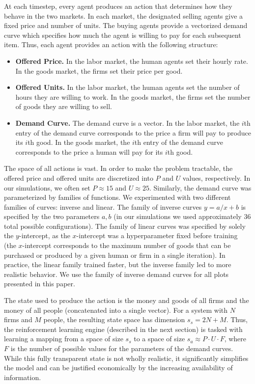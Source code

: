 \documentclass[twoside,twocolumn]{article}
\begin{document}
At each timestep, every agent produces an action that determines how they behave in the two markets. In each market, the designated selling agents give a fixed price and number of units. The buying agents provide a vectorized demand curve which specifies how much the agent is willing to pay for each subsequent item. Thus, each agent provides an action with the following structure:
\begin{itemize}
  \item \textbf{Offered Price.} In the labor market, the human agents set their hourly rate. In the goods market, the firms set their price per good.
  \item \textbf{Offered Units.} In the labor market, the human agents set the number of hours they are willing to work. In the goods market, the firms set the number of goods they are willing to sell.
  \item \textbf{Demand Curve.} The demand curve is a vector. In the labor market, the $i$th entry of the demand curve corresponds to the price a firm will pay to produce its $i$th good. In the goods market, the $i$th entry of the demand curve corresponds to the price a human will pay for its $i$th good.
\end{itemize}

The space of all actions is vast. In order to make the problem tractable, the offered price and offered units are discretized into $P$ and $U$ values, respectively. In our simulations, we often set $P \approx 15$ and $U \approx 25$. Similarly, the demand curve was parameterized by families of functions. We experimented with two different families of curves: inverse and linear. The family of inverse curves $y = a/x + b$ is specified by the two parameters $a, b$ (in our simulations we used approximately 36 total possible configurations). The family of linear curves was specified by solely the $y$-intercept, as the $x$-intercept was a hyperparameter fixed before training (the $x$-intercept corresponds to the maximum number of goods that can be purchased or produced by a given human or firm in a single iteration). In practice, the linear family trained faster, but the inverse family led to more realistic behavior. We use the family of inverse demand curves for all plots presented in this paper.

\medskip

The state used to produce the action is the money and goods of all firms and the money of all people (concatenated into a single vector). For a system with $N$ firms and $M$ people, the resulting state space has dimension $s_s = 2N + M$. Thus, the reinforcement learning engine (described in the next section) is tasked with learning a mapping from a space of size $s_s$ to a space of size $s_a \approx P \cdot U \cdot F$, where $F$ is the number of possible values for the parameters of the demand curves. While this fully transparent state is not wholly realistic, it significantly simplifies the model and can be justified economically by the increasing availability of information.
\end{document}
